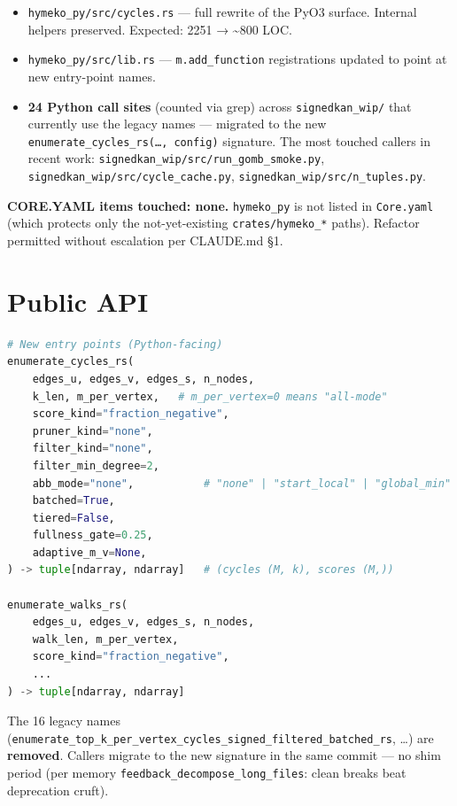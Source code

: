 \documentclass[11pt]{article}
\begin{document}
\begin{itemize}
  \item \texttt{hymeko\_py/src/cycles.rs} — full rewrite of the
    PyO3 surface.  Internal helpers preserved.
    Expected: 2251 → \textasciitilde 800 LOC.
  \item \texttt{hymeko\_py/src/lib.rs} — \texttt{m.add\_function}
    registrations updated to point at new entry-point names.
  \item \textbf{24 Python call sites} (counted via grep) across
    \texttt{signedkan\_wip/} that currently use the legacy names —
    migrated to the new \texttt{enumerate\_cycles\_rs(\dots, config)}
    signature.  The most touched callers in recent work:
    \texttt{signedkan\_wip/src/run\_gomb\_smoke.py},
    \texttt{signedkan\_wip/src/cycle\_cache.py},
    \texttt{signedkan\_wip/src/n\_tuples.py}.
\end{itemize}

\textbf{CORE.YAML items touched: none.}  \texttt{hymeko\_py} is not
listed in \texttt{Core.yaml} (which protects only the not-yet-existing
\texttt{crates/hymeko\_*} paths).  Refactor permitted without
escalation per CLAUDE.md \S1.

\section{Public API}

\begin{lstlisting}[language=Python]
# New entry points (Python-facing)
enumerate_cycles_rs(
    edges_u, edges_v, edges_s, n_nodes,
    k_len, m_per_vertex,   # m_per_vertex=0 means "all-mode"
    score_kind="fraction_negative",
    pruner_kind="none",
    filter_kind="none",
    filter_min_degree=2,
    abb_mode="none",           # "none" | "start_local" | "global_min"
    batched=True,
    tiered=False,
    fullness_gate=0.25,
    adaptive_m_v=None,
) -> tuple[ndarray, ndarray]   # (cycles (M, k), scores (M,))

enumerate_walks_rs(
    edges_u, edges_v, edges_s, n_nodes,
    walk_len, m_per_vertex,
    score_kind="fraction_negative",
    ...
) -> tuple[ndarray, ndarray]
\end{lstlisting}

The 16 legacy names (\texttt{enumerate\_top\_k\_per\_vertex\_cycles\_signed\_filtered\_batched\_rs},
\dots) are \textbf{removed}.  Callers migrate to the new signature in
the same commit — no shim period (per memory
\texttt{feedback\_decompose\_long\_files}: clean breaks beat deprecation cruft).
\end{document}
